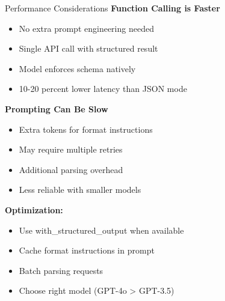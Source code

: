 \documentclass[aspectratio=169,11pt]{beamer}
\begin{document}
\begin{frame}{Performance Considerations}
\textbf{Function Calling is Faster}
\begin{itemize}
  \setlength{\itemsep}{1pt}
  \item No extra prompt engineering needed
  \item Single API call with structured result
  \item Model enforces schema natively
  \item 10-20 percent lower latency than JSON mode
\end{itemize}

\vspace{0.1cm}

\textbf{Prompting Can Be Slow}
\begin{itemize}
  \setlength{\itemsep}{1pt}
  \item Extra tokens for format instructions
  \item May require multiple retries
  \item Additional parsing overhead
  \item Less reliable with smaller models
\end{itemize}

\vspace{0.1cm}

\textbf{Optimization:}
\begin{itemize}
  \setlength{\itemsep}{1pt}
  \item Use with\_structured\_output when available
  \item Cache format instructions in prompt
  \item Batch parsing requests
  \item Choose right model (GPT-4o > GPT-3.5)
\end{itemize}
\vspace{-0.12cm}
\end{frame}
\end{document}
